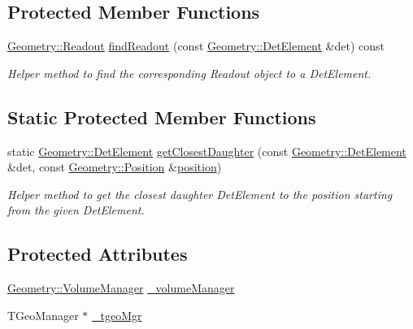 \subsection*{Protected Member Functions}
\begin{DoxyCompactItemize}
\item 
\hyperlink{class_d_d4hep_1_1_geometry_1_1_readout}{Geometry\+::\+Readout} \hyperlink{class_d_d4hep_1_1_d_d_rec_1_1_i_d_decoder_af87ecd82999db5fe7598179a9a25e8cb}{find\+Readout} (const \hyperlink{class_d_d4hep_1_1_geometry_1_1_det_element}{Geometry\+::\+Det\+Element} \&det) const
\begin{DoxyCompactList}\small\item\em Helper method to find the corresponding Readout object to a Det\+Element. \end{DoxyCompactList}\end{DoxyCompactItemize}
\subsection*{Static Protected Member Functions}
\begin{DoxyCompactItemize}
\item 
static \hyperlink{class_d_d4hep_1_1_geometry_1_1_det_element}{Geometry\+::\+Det\+Element} \hyperlink{class_d_d4hep_1_1_d_d_rec_1_1_i_d_decoder_a7ff69a5376066763ee49fdf228a362b3}{get\+Closest\+Daughter} (const \hyperlink{class_d_d4hep_1_1_geometry_1_1_det_element}{Geometry\+::\+Det\+Element} \&det, const \hyperlink{namespace_d_d4hep_1_1_geometry_a55083902099d03506c6db01b80404900}{Geometry\+::\+Position} \&\hyperlink{class_d_d4hep_1_1_d_d_rec_1_1_i_d_decoder_a6efa19e0bd4211d9c34c437fc80c15c7}{position})
\begin{DoxyCompactList}\small\item\em Helper method to get the closest daughter Det\+Element to the position starting from the given Det\+Element. \end{DoxyCompactList}\end{DoxyCompactItemize}
\subsection*{Protected Attributes}
\begin{DoxyCompactItemize}
\item 
\hyperlink{class_d_d4hep_1_1_geometry_1_1_volume_manager}{Geometry\+::\+Volume\+Manager} \hyperlink{class_d_d4hep_1_1_d_d_rec_1_1_i_d_decoder_ad5da6c6624c9c8fa3fa9c0590d9bbb70}{\+\_\+volume\+Manager}
\item 
T\+Geo\+Manager $\ast$ \hyperlink{class_d_d4hep_1_1_d_d_rec_1_1_i_d_decoder_ac50ec26200a394bf0d75f44898910815}{\+\_\+tgeo\+Mgr}
\end{DoxyCompactItemize}
